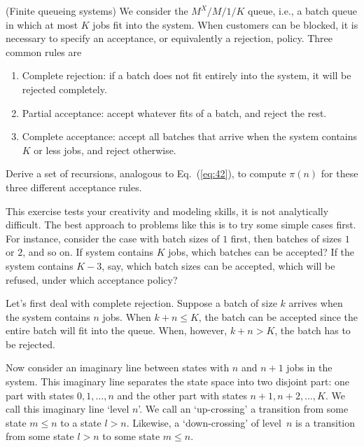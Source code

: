 \begin{exercise}{\faPhoto}(Finite queueing systems) We consider the $M^X/M/1/K$
queue, i.e., a batch queue in which at most $K$ jobs fit into the
system. When customers can be blocked, it is necessary to specify an
acceptance, or equivalently a rejection, policy. Three common rules are
\begin{enumerate}
\item Complete rejection: if a batch does not fit entirely into the system, it will be rejected completely.
\item Partial acceptance: accept whatever fits of a batch, and reject the rest.
\item Complete acceptance: accept all batches that arrive when the
  system contains $K$ or less jobs, and reject otherwise.
\end{enumerate}
Derive a set of recursions, analogous to Eq.~(\ref{eq:42}), to compute
$\pi(n)$ for these three different acceptance rules.  
\begin{hint}
This
  exercise tests your creativity and modeling skills, it is not
  analytically difficult.  The best approach to problems like this is
  to try some simple cases first. For instance, consider the case with
  batch sizes of $1$ first, then batches of sizes $1$ or $2$, and so
  on. If system contains $K$ jobs, which batches can be accepted? If
  the system contains $K-3$, say, which batch sizes can be accepted,
  which will be refused, under which acceptance policy? 
\end{hint}
\begin{solution}
  Let's first deal with complete rejection. Suppose a batch of size
  $k$ arrives when the system contains $n$ jobs. When $k+n \leq K$,
  the batch can be accepted since the entire batch will fit into the
  queue.  When, however, $k+n> K$, the batch has to be rejected. 

  Now consider an imaginary line between states with $n$ and $n+1$
  jobs in the system. This imaginary line separates the state space
  into two disjoint part: one part with states $0, 1, \ldots, n$ and
  the other part with states $n+1, n+2, \ldots, K$. We call this
  imaginary line `level $n$'.  We call an `up-crossing' a transition
  from some state $m\leq n$ to a state $l> n$. Likewise, a `down-crossing'  of level~$n$ is a transition from some state $l> n$ to some state $m\leq n$.


\end{solution}
\end{exercise}
